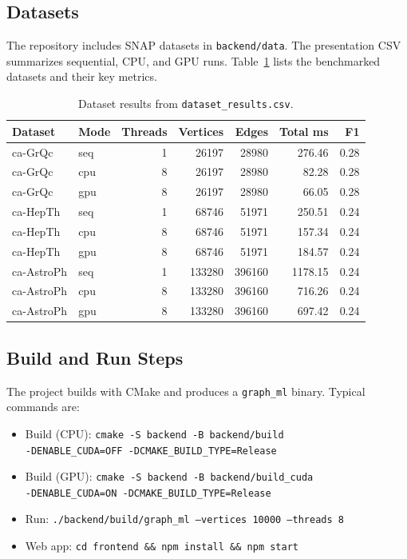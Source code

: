 \documentclass[11pt]{article}
\begin{document}
\subsection{Datasets}
The repository includes SNAP datasets in \texttt{backend/data}. The presentation CSV summarizes sequential, CPU, and GPU runs. Table~\ref{tab:datasets} lists the benchmarked datasets and their key metrics.

\begin{table}[H]
\centering
\caption{Dataset results from \texttt{dataset\_results.csv}.}
\label{tab:datasets}
\small
\begin{tabular}{l l r r r r r}
\toprule
Dataset & Mode & Threads & Vertices & Edges & Total ms & F1 \\
\midrule
ca-GrQc & seq & 1 & 26197 & 28980 & 276.46 & 0.28 \\
ca-GrQc & cpu & 8 & 26197 & 28980 & 82.28 & 0.28 \\
ca-GrQc & gpu & 8 & 26197 & 28980 & 66.05 & 0.28 \\
ca-HepTh & seq & 1 & 68746 & 51971 & 250.51 & 0.24 \\
ca-HepTh & cpu & 8 & 68746 & 51971 & 157.34 & 0.24 \\
ca-HepTh & gpu & 8 & 68746 & 51971 & 184.57 & 0.24 \\
ca-AstroPh & seq & 1 & 133280 & 396160 & 1178.15 & 0.24 \\
ca-AstroPh & cpu & 8 & 133280 & 396160 & 716.26 & 0.24 \\
ca-AstroPh & gpu & 8 & 133280 & 396160 & 697.42 & 0.24 \\
\bottomrule
\end{tabular}
\end{table}

\subsection{Build and Run Steps}
The project builds with CMake and produces a \texttt{graph\_ml} binary. Typical commands are:
\begin{itemize}
  \item Build (CPU):
  \texttt{cmake -S backend -B backend/build\\
  -DENABLE\_CUDA=OFF -DCMAKE\_BUILD\_TYPE=Release}
  \item Build (GPU):
  \texttt{cmake -S backend -B backend/build\_cuda\\
  -DENABLE\_CUDA=ON -DCMAKE\_BUILD\_TYPE=Release}
  \item Run:
  \texttt{./backend/build/graph\_ml --vertices 10000 --threads 8}
  \item Web app:
  \texttt{cd frontend \&\& npm install \&\& npm start}
\end{itemize}
\end{document}
